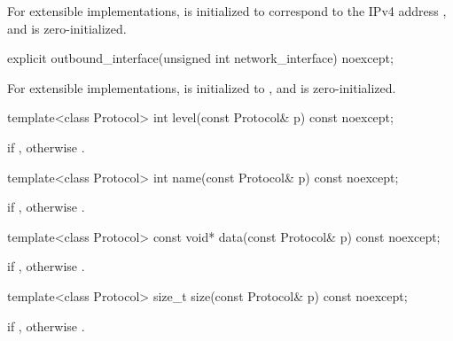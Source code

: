 \begin{itemdescr}
\pnum
\effects For extensible implementations,  is initialized to correspond to the IPv4 address , and  is zero-initialized.
\end{itemdescr}

\begin{itemdecl}
explicit outbound_interface(unsigned int network_interface) noexcept;
\end{itemdecl}

\begin{itemdescr}
\pnum
\effects For extensible implementations,  is initialized to , and  is zero-initialized.
\end{itemdescr}

\begin{itemdecl}
template<class Protocol> int level(const Protocol& p) const noexcept;
\end{itemdecl}

\begin{itemdescr}
\pnum
\returns {} if , otherwise .
\end{itemdescr}

\begin{itemdecl}
template<class Protocol> int name(const Protocol& p) const noexcept;
\end{itemdecl}

\begin{itemdescr}
\pnum
\returns {} if , otherwise .
\end{itemdescr}

\begin{itemdecl}
template<class Protocol> const void* data(const Protocol& p) const noexcept;
\end{itemdecl}

\begin{itemdescr}
\pnum
\returns {} if , otherwise .
\end{itemdescr}

\begin{itemdecl}
template<class Protocol> size_t size(const Protocol& p) const noexcept;
\end{itemdecl}

\begin{itemdescr}
\pnum
\returns {} if , otherwise .
\end{itemdescr}




